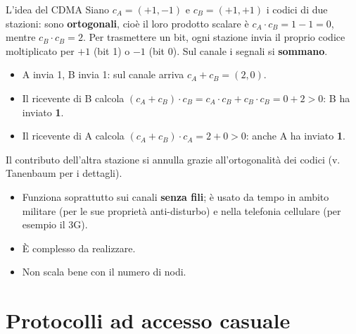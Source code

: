 
\begin{esempio}{L'idea del CDMA}
Siano $c_A = (+1, -1)$ e $c_B = (+1, +1)$ i codici di due stazioni: sono \textbf{ortogonali}, cioè il loro prodotto scalare è
$c_A \cdot c_B = 1 - 1 = 0$, mentre $c_B \cdot c_B = 2$. Per trasmettere un bit, ogni stazione invia il proprio codice moltiplicato per
$+1$ (bit 1) o $-1$ (bit 0). Sul canale i segnali si \textbf{sommano}.
\begin{itemize}
    \item A invia 1, B invia 1: sul canale arriva $c_A + c_B = (2, 0)$.
    \item Il ricevente di B calcola $(c_A + c_B)\cdot c_B = c_A\cdot c_B + c_B \cdot c_B = 0 + 2 > 0$: B ha inviato \textbf{1}.
    \item Il ricevente di A calcola $(c_A + c_B)\cdot c_A = 2 + 0 > 0$: anche A ha inviato \textbf{1}.
\end{itemize}
Il contributo dell'altra stazione si annulla grazie all'ortogonalità dei codici (v. Tanenbaum per i dettagli).
\end{esempio}

\begin{itemize}
    \item Funziona soprattutto sui canali \textbf{senza fili}; è usato da tempo in ambito militare (per le sue proprietà anti-disturbo) e
          nella telefonia cellulare (per esempio il 3G).
    \item[\icross] È complesso da realizzare.
    \item[\icross] Non scala bene con il numero di nodi.
\end{itemize}


\section{Protocolli ad accesso casuale}

